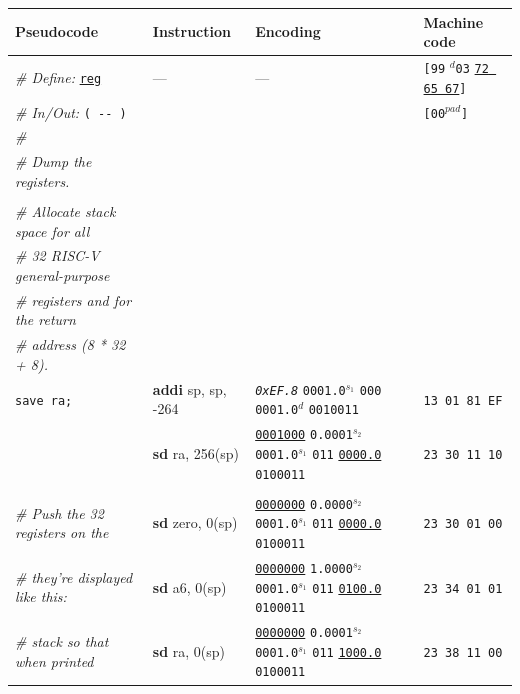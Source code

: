 \documentclass[a4paper,12pt,final]{article}
\begin{document}
\begin{table}[!htbp] \begin{adjustwidth}{-1cm}{-1cm} \fontsize{8}{9.600000}\selectfont
\begin{center}
\begin{tabular}{l|ll|l}
\textbf{Pseudocode} & \textbf{Instruction} & \textbf{Encoding} & \textbf{Machine code}\\[0pt]
\hline
\emph{\# Define:} \uline{\texttt{reg}} & --- & --- & \texttt{[99} \(^{d}\)​\texttt{03} \uline{\texttt{72 65 67}}​\texttt{]}\\[0pt]
\emph{\# In/Out:} \texttt{( -​- )} &  &  & \texttt{[00}​\(^{pad}\)​\texttt{]}\\[0pt]
\emph{\#} &  &  & \\[0pt]
\emph{\# Dump the registers.} &  &  & \\[0pt]
 &  &  & \\[0pt]
\emph{\# Allocate stack space for all} &  &  & \\[0pt]
\emph{\# 32 RISC-V general-purpose} &  &  & \\[0pt]
\emph{\# registers and for the return} &  &  & \\[0pt]
\emph{\# address (8 * 32 + 8).} &  &  & \\[0pt]
\texttt{save ra;} & \textbf{addi} sp, sp, -264 & \emph{\texttt{0xEF.8}}                    \texttt{0001.0}​\(^{s_{1}}\) \texttt{000} \texttt{0001.0}​\(^{d}\)  \texttt{0010011} & \texttt{13 01 81 EF}\\[0pt]
 & \textbf{sd} ra, 256(sp) & \uline{\texttt{0001000}} \texttt{0.0001}​\(^{s_{2}}\) \texttt{0001.0}​\(^{s_{1}}\) \texttt{011} \uline{\texttt{0000.0}} \texttt{0100011} & \texttt{23 30 11 10}\\[0pt]
 &  &  & \\[0pt]
\emph{\# Push the 32 registers on the} & \textbf{sd} zero,  0(sp) & \uline{\texttt{0000000}} \texttt{0.0000}​\(^{s_{2}}\) \texttt{0001.0}​\(^{s_{1}}\) \texttt{011} \uline{\texttt{0000.0}} \texttt{0100011} & \texttt{23 30 01 00}\\[0pt]
\emph{\# they're displayed like this:} & \textbf{sd} a6,    0(sp) & \uline{\texttt{0000000}} \texttt{1.0000}​\(^{s_{2}}\) \texttt{0001.0}​\(^{s_{1}}\) \texttt{011} \uline{\texttt{0100.0}} \texttt{0100011} & \texttt{23 34 01 01}\\[0pt]
\emph{\# stack so that when printed} & \textbf{sd} ra,    0(sp) & \uline{\texttt{0000000}} \texttt{0.0001}​\(^{s_{2}}\) \texttt{0001.0}​\(^{s_{1}}\) \texttt{011} \uline{\texttt{1000.0}} \texttt{0100011} & \texttt{23 38 11 00}\\[0pt]

\end{tabular}
\end{center}
\end{adjustwidth}
\end{table}
\end{document}
